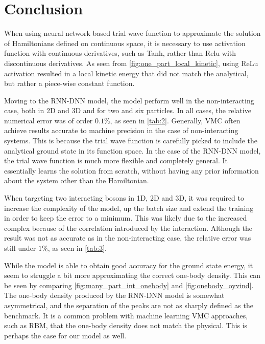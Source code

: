 \begin{minipage}{\columnwidth}
\section{Conclusion}\label{sec:Conclusion}
When using neural network based trial wave function to approximate the solution of Hamiltonians defined on continuous space, it is necessary to use activation function with continuous derivatives, such as Tanh, rather than Relu with discontinuous derivatives. As seen from \autoref{fig:one_part_local_kinetic}, using ReLu activation resulted in a local kinetic energy that did not match the analytical, but rather a piece-wise constant function.

Moving to the RNN-DNN model, the model perform well in the non-interacting case, both in 2D and 3D and for two and six particles. In all cases, the relative numerical error was of order $0.1\%$, as seen in \autoref{tab:2}. Generally, VMC often achieve results accurate to machine precision in the case of non-interacting systems. This is because the trial wave function is carefully picked to include the analytical ground state in its function space. In the case of the RNN-DNN model, the trial wave function is much more flexible and completely general. It essentially learns the solution from scratch, without having any prior information about the system other than the Hamiltonian.

When targeting two interacting bosons in 1D, 2D and 3D, it was required to increase the complexity of the model, up the batch size and extend the training in order to keep the error to a minimum. This was likely due to the increased complex because of the correlation introduced by the interaction. Although the result was not as accurate as in the non-interacting case, the relative error was still under $1\%$, as seen in \autoref{tab:3}.

While the model is able to obtain good accuracy for the ground state energy, it seem to struggle a bit more approximating the correct one-body density. This can be seen by comparing \autoref{fig:many_part_int_onebody} and \autoref{fig:onebody_oyvind}. The one-body density produced by the RNN-DNN model is somewhat asymmetrical, and the separation of the peaks are not as sharply defined as the benchmark. It is a common problem with machine learning VMC approaches, such as RBM, that the one-body density does not match the physical. This is perhaps the case for our model as well.

\end{minipage}

